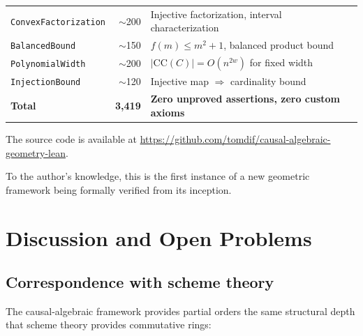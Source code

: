 \documentclass[11pt,a4paper]{article}
\theoremstyle{plain}
\theoremstyle{definition}
\theoremstyle{remark}
\newcommand{\CC}{\mathrm{CC}}
\begin{document}
\begin{center}
\begin{tabular}{lrl}
\texttt{ConvexFactorization}    & $\sim$200 & Injective factorization, interval characterization \\
\texttt{BalancedBound}          & $\sim$150 & $f(m) \leq m^2+1$, balanced product bound \\
\texttt{PolynomialWidth}        & $\sim$200 & $|\CC(C)| = O(n^{2w})$ for fixed width \\
\texttt{InjectionBound}         & $\sim$120 & Injective map $\Rightarrow$ cardinality bound \\
\midrule
\textbf{Total}                  & \textbf{3{,}419} & \textbf{Zero unproved assertions, zero custom axioms} \\
\bottomrule
\end{tabular}
\end{center}

\medskip

The source code is available at \url{https://github.com/tomdif/causal-algebraic-geometry-lean}.

To the author's knowledge, this is the first instance of a new geometric framework being formally verified from its inception.


\section{Discussion and Open Problems}\label{sec:discussion}

\subsection{Correspondence with scheme theory}

The causal-algebraic framework provides partial orders the same structural depth that scheme theory provides commutative rings:
\end{document}
